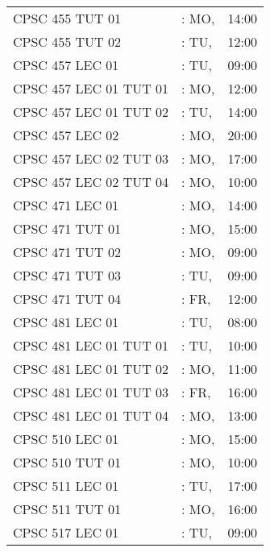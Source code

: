 \documentclass[11pt]{article}
\begin{document}
\begin{longtable}{l l r}
CPSC 455 TUT 01               &\hspace*{1.5cm}:  MO,& 14:00\tabularnewline
CPSC 455 TUT 02               &\hspace*{1.5cm}:  TU,& 12:00\tabularnewline
CPSC 457 LEC 01               &\hspace*{1.5cm}:  TU,& 09:00\tabularnewline
CPSC 457 LEC 01 TUT 01        &\hspace*{1.5cm}:  MO,& 12:00\tabularnewline
CPSC 457 LEC 01 TUT 02        &\hspace*{1.5cm}:  TU,& 14:00\tabularnewline
CPSC 457 LEC 02               &\hspace*{1.5cm}:  MO,& 20:00\tabularnewline
CPSC 457 LEC 02 TUT 03        &\hspace*{1.5cm}:  MO,& 17:00\tabularnewline
CPSC 457 LEC 02 TUT 04        &\hspace*{1.5cm}: MO,& 10:00\tabularnewline
CPSC 471 LEC 01               &\hspace*{1.5cm}: MO,& 14:00\tabularnewline
CPSC 471 TUT 01               &\hspace*{1.5cm}: MO,& 15:00\tabularnewline
CPSC 471 TUT 02               &\hspace*{1.5cm}: MO,& 09:00\tabularnewline
CPSC 471 TUT 03               &\hspace*{1.5cm}: TU,& 09:00\tabularnewline
CPSC 471 TUT 04               &\hspace*{1.5cm}: FR,& 12:00\tabularnewline
CPSC 481 LEC 01               &\hspace*{1.5cm}: TU,& 08:00\tabularnewline
CPSC 481 LEC 01 TUT 01        &\hspace*{1.5cm}: TU,& 10:00\tabularnewline
CPSC 481 LEC 01 TUT 02        &\hspace*{1.5cm}: MO,& 11:00\tabularnewline
CPSC 481 LEC 01 TUT 03        &\hspace*{1.5cm}: FR,& 16:00\tabularnewline
CPSC 481 LEC 01 TUT 04        &\hspace*{1.5cm}: MO,& 13:00\tabularnewline
CPSC 510 LEC 01               &\hspace*{1.5cm}: MO,& 15:00\tabularnewline
CPSC 510 TUT 01               &\hspace*{1.5cm}: MO,& 10:00\tabularnewline
CPSC 511 LEC 01               &\hspace*{1.5cm}: TU,& 17:00\tabularnewline
CPSC 511 TUT 01               &\hspace*{1.5cm}: MO,& 16:00\tabularnewline
CPSC 517 LEC 01               &\hspace*{1.5cm}: TU,& 09:00\tabularnewline

\end{longtable}
\end{document}
